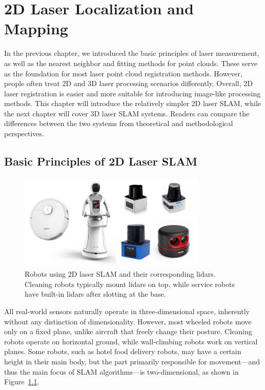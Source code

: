\thispagestyle{empty}  
\chapter{2D Laser Localization and Mapping}  
\thispagestyle{empty}  
\label{cpt:2d-mapping}  
In the previous chapter, we introduced the basic principles of laser measurement, as well as the nearest neighbor and fitting methods for point clouds. These serve as the foundation for most laser point cloud registration methods. However, people often treat 2D and 3D laser processing scenarios differently. Overall, 2D laser registration is easier and more suitable for introducing image-like processing methods. This chapter will introduce the relatively simpler 2D laser SLAM, while the next chapter will cover 3D laser SLAM systems. Readers can compare the differences between the two systems from theoretical and methodological perspectives.  



\section{Basic Principles of 2D Laser SLAM}

\begin{figure}[!htp]  
	\centering  
	\includegraphics[width=0.8\textwidth]{resources/2d-lidar-mapping/2d-robots.pdf}  
	\caption{Robots using 2D laser SLAM and their corresponding lidars. Cleaning robots typically mount lidars on top, while service robots have built-in lidars after slotting at the base.}  
	\label{fig:2d-robots}  
\end{figure}  

All real-world sensors naturally operate in three-dimensional space, inherently without any distinction of dimensionality. However, most wheeled robots move only on a fixed plane, unlike aircraft that freely change their posture. Cleaning robots operate on horizontal ground, while wall-climbing robots work on vertical planes. Some robots, such as hotel food delivery robots, may have a certain height in their main body, but the part primarily responsible for movement—and thus the main focus of SLAM algorithms—is two-dimensional, as shown in Figure~\ref{fig:2d-robots}.  

